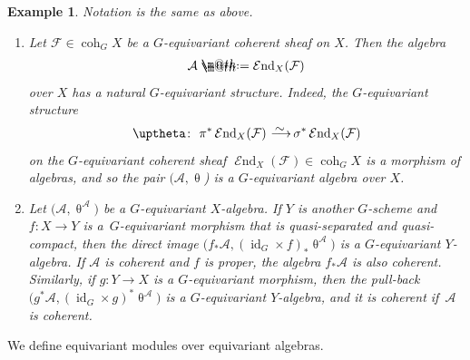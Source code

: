 \documentclass[10pt,a4paper]{amsart}
\makeatletter
\newtheorem{exa}[dfn]{Example}
\newcommand*{\defeq}{\mathrel{\rlap{%
 \raisebox{0.3ex}{$\m@th\cdot$}}%
 \raisebox{-0.3ex}{$\m@th\cdot$}}%
 =}
\numberwithin{equation}{section}
\newcommand{\cEnd}{\operatorname{{\mathcal E}nd}}
\newcommand{\coh}{\operatorname{coh}}
\newcommand{\id}{\operatorname{id}}
\newcommand{\cA}{\mathcal{A}}
\newcommand{\cF}{\mathcal{F}}
\newcommand{\simto}{\,\,\,\,\raisebox{4pt}{$\sim$}{\kern -1.1em \longrightarrow}\,}
\makeatother
\begin{document}
\begin{exa}\label{end ex}
Notation is the same as above.
\begin{enumerate}\itemsep=0pt
\item Let $\cF\in \coh_GX$ be a $G$-equivariant coherent sheaf on $X$. Then the algebra
\begin{gather*}
\cA\defeq\cEnd_X(\cF)
\end{gather*}
over $X$ has a natural $G$-equivariant structure. Indeed, the $G$-equivariant structure
\begin{gather*}
\uptheta\colon\ \pi^*\cEnd_X(\cF)\simto \sigma^*\cEnd_X(\cF)
\end{gather*}
on the $G$-equivariant coherent sheaf $\cEnd_X(\cF)\in\coh_GX$
is a morphism of algebras, and so the pair $(\cA, \uptheta$) is a $G$-equivariant algebra over $X$.


\item Let $\big(\cA,\uptheta^{\cA}\big)$ be a $G$-equivariant $X$-algebra. If $Y$ is another $G$-scheme and $f\colon X\to Y$ is a~$G$-equ\-i\-variant morphism that is quasi-separated and quasi-compact,
then the direct image
$\big(f_*\cA,(\id_G\times f)_*\uptheta^{\cA}\big)$
is a $G$-equivariant $Y$-algebra. If $\cA$ is coherent and $f$ is proper, the algebra $f_*\cA$ is also coherent. Similarly, if $g\colon Y\to X$ is a $G$-equivariant morphism, then the pull-back $\big(g^*\cA,(\id_G\times g)^*\uptheta^{\cA}\big)$ is a $G$-equivariant $Y$-algebra, and it is coherent if~$\cA$ is coherent.
 \end{enumerate}
\end{exa}



We define equivariant modules over equivariant algebras.
\end{document}
